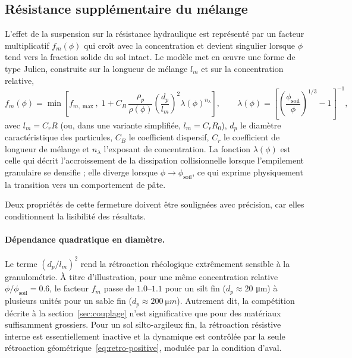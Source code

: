 \documentclass[11pt,a4paper]{report}
\newcommand{\phisol}{\phi_{\mathrm{soil}}}
\begin{document}
\subsection{Résistance supplémentaire du mélange}

L'effet de la suspension sur la résistance hydraulique est représenté par un facteur multiplicatif
\(f_m(\phi)\) qui croît avec la concentration et devient singulier lorsque \(\phi\) tend vers la fraction
solide du sol intact. Le modèle met en œuvre une forme de type Julien, construite sur la longueur de
mélange \(l_m\) et sur la concentration relative,
\begin{equation}
f_m(\phi) = \min\left[f_{m,\max},\;
1 + C_B\,\frac{\rho_p}{\rho(\phi)}\left(\frac{d_p}{l_m}\right)^{2}\lambda(\phi)^{n_\lambda}\right],
\qquad
\lambda(\phi) = \left[\left(\frac{\phisol}{\phi}\right)^{1/3}-1\right]^{-1},
\label{eq:fm}
\end{equation}
avec \(l_m = C_r R\) (ou, dans une variante simplifiée, \(l_m = C_r R_0\)), \(d_p\) le diamètre
caractéristique des particules, \(C_B\) le coefficient dispersif, \(C_r\) le coefficient de longueur de
mélange et \(n_\lambda\) l'exposant de concentration. La fonction \(\lambda(\phi)\) est celle qui décrit
l'accroissement de la dissipation collisionnelle lorsque l'empilement granulaire se densifie ; elle diverge
lorsque \(\phi \to \phisol\), ce qui exprime physiquement la transition vers un comportement de pâte.

Deux propriétés de cette fermeture doivent être soulignées avec précision, car elles conditionnent la
lisibilité des résultats.

\paragraph{Dépendance quadratique en diamètre.} Le terme \((d_p/l_m)^2\) rend la rétroaction rhéologique
extrêmement sensible à la granulométrie. À titre d'illustration, pour une même concentration relative
\(\phi/\phisol = 0.6\), le facteur \(f_m\) passe de \(1.0\)--\(1.1\) pour un silt fin (\(d_p \approx 20\)
\si{\micro m}) à plusieurs unités pour un sable fin (\(d_p \approx 200\ \si{\micro m}\)). Autrement dit,
la compétition décrite à la section~\ref{sec:couplage} n'est significative que pour des matériaux
suffisamment grossiers. Pour un sol silto-argileux fin, la rétroaction résistive interne est
essentiellement inactive et la dynamique est contrôlée par la seule rétroaction
géométrique~\eqref{eq:retro-positive}, modulée par la condition d'aval.
\end{document}
